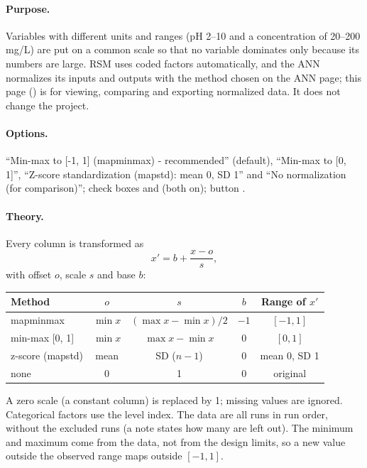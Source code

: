 \paragraph{Purpose.} Variables with different units and ranges (pH 2--10 and a concentration of 20--200 mg/L) are
put on a common scale so that no variable dominates only because its numbers are large. RSM uses coded factors
automatically, and the ANN normalizes its inputs and outputs with the method chosen on the ANN page; this page
() is for viewing, comparing and exporting normalized data. It does
not change the project.

\paragraph{Options.}  ``Min-max to [-1, 1] (mapminmax) - recommended'' (default), ``Min-max to [0,
1]'', ``Z-score standardization (mapstd): mean 0, SD 1'' and ``No normalization (for comparison)''; check boxes
 and  (both on); button .

\paragraph{Theory.} Every column is transformed as
\begin{equation}
x' = b + \frac{x - o}{s},
\label{eq:ch04-norm}
\end{equation}
with offset $o$, scale $s$ and base $b$:
\begin{center}
\small
\begin{tabular}{@{}lcccc@{}}
\toprule
Method & $o$ & $s$ & $b$ & Range of $x'$ \\
\midrule
mapminmax & $\min x$ & $(\max x - \min x)/2$ & $-1$ & $[-1, 1]$ \\
min-max [0, 1] & $\min x$ & $\max x - \min x$ & 0 & $[0, 1]$ \\
z-score (mapstd) & mean & SD ($n-1$) & 0 & mean 0, SD 1 \\
none & 0 & 1 & 0 & original \\
\bottomrule
\end{tabular}
\end{center}
A zero scale (a constant column) is replaced by 1; missing values are ignored. Categorical factors use the level
index. The data are all runs in run order, without the excluded runs (a note states how many are left out). The
minimum and maximum come from the data, not from the design limits, so a new value outside the observed range maps
outside $[-1, 1]$.

